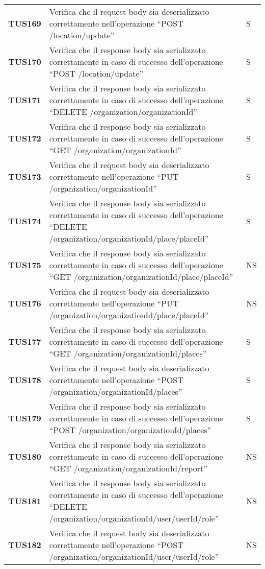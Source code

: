 \documentclass[../../piano-di-qualifica.tex]{subfiles}
\begin{document}
\begin{longtable}[H]{>{\centering\bfseries}m{3cm} >{}m{10cm} >{\centering\arraybackslash}m{3cm}}

  TUS169 & Verifica che il request body sia deserializzato correttamente nell'operazione ``POST /location/update'' & S \\
  TUS170 & Verifica che il response body sia serializzato correttamente in caso di successo dell'operazione ``POST /location/update'' & S \\
  TUS171 & Verifica che il response body sia serializzato correttamente in caso di successo dell'operazione ``DELETE /organization/{organizationId}'' & S \\
  TUS172 & Verifica che il response body sia serializzato correttamente in caso di successo dell'operazione ``GET /organization/{organizationId}'' & S \\
  TUS173 & Verifica che il request body sia deserializzato correttamente nell'operazione ``PUT /organization/{organizationId}'' & S \\
  TUS174 & Verifica che il response body sia serializzato correttamente in caso di successo dell'operazione ``DELETE /organization/{organizationId}/place/{placeId}'' & S \\
  TUS175 & Verifica che il response body sia serializzato correttamente in caso di successo dell'operazione ``GET /organization/{organizationId}/place/{placeId}'' & NS \\
  TUS176 & Verifica che il request body sia deserializzato correttamente nell'operazione ``PUT /organization/{organizationId}/place/{placeId}'' & NS \\
  TUS177 & Verifica che il response body sia serializzato correttamente in caso di successo dell'operazione ``GET /organization/{organizationId}/places'' & S \\
  TUS178 & Verifica che il request body sia deserializzato correttamente nell'operazione ``POST /organization/{organizationId}/places'' & S \\
  TUS179 & Verifica che il response body sia serializzato correttamente in caso di successo dell'operazione ``POST /organization/{organizationId}/places'' & S \\
  TUS180 & Verifica che il response body sia serializzato correttamente in caso di successo dell'operazione ``GET /organization/{organizationId}/report'' & NS \\
  TUS181 & Verifica che il response body sia serializzato correttamente in caso di successo dell'operazione ``DELETE /organization/{organizationId}/user/{userId}/role'' & NS \\
  TUS182 & Verifica che il request body sia deserializzato correttamente nell'operazione ``POST /organization/{organizationId}/user/{userId}/role'' & NS \\

\end{longtable}
\end{document}
